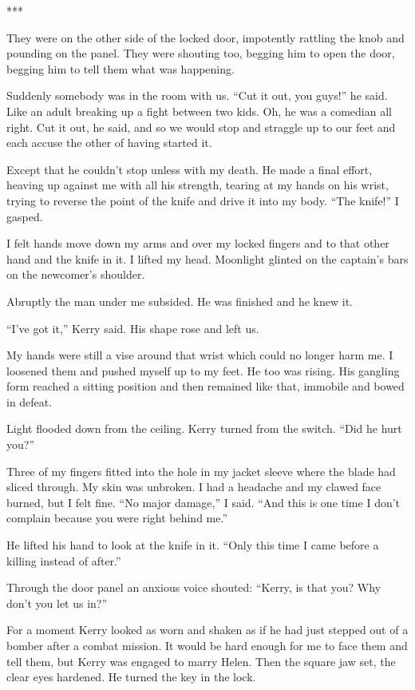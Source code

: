 {***

They were on the other side of the locked door, impotently rattling the knob and pounding on the panel. They were shouting too, begging him to open the door, begging him to tell them what was happening.

Suddenly somebody was in the room with us. “Cut it out, you guys!” he said. Like an adult breaking up a fight between two kids. Oh, he was a comedian all right. Cut it out, he said, and so we would stop and straggle up to our feet and each accuse the other of having started it.

Except that he couldn’t stop unless with my death. He made a final effort, heaving up against me with all his strength, tearing at my hands on his wrist, trying to reverse the point of the knife and drive it into my body. “The knife!” I gasped.

I felt hands move down my arms and over my locked fingers and to that other hand and the knife in it. I lifted my head. Moonlight glinted on the captain’s bars on the newcomer’s shoulder.

Abruptly the man under me subsided. He was finished and he knew it.

“I’ve got it,” Kerry said. His shape rose and left us.

My hands were still a vise around that wrist which could no longer harm me. I loosened them and pushed myself up to my feet. He too was rising. His gangling form reached a sitting position and then remained like that, immobile and bowed in defeat.

Light flooded down from the ceiling. Kerry turned from the switch. “Did he hurt you?”

Three of my fingers fitted into the hole in my jacket sleeve where the blade had sliced through. My skin was unbroken. I had a headache and my clawed face burned, but I felt fine. “No major damage,” I said. “And this is one time I don’t complain because you were right behind me.”

He lifted his hand to look at the knife in it. “Only this time I came before a killing instead of after.”

Through the door panel an anxious voice shouted: “Kerry, is that you? Why don’t you let us in?”

For a moment Kerry looked as worn and shaken as if he had just stepped out of a bomber after a combat mission. It would be hard enough for me to face them and tell them, but Kerry was engaged to marry Helen. Then the square jaw set, the clear eyes hardened. He turned the key in the lock.

}
